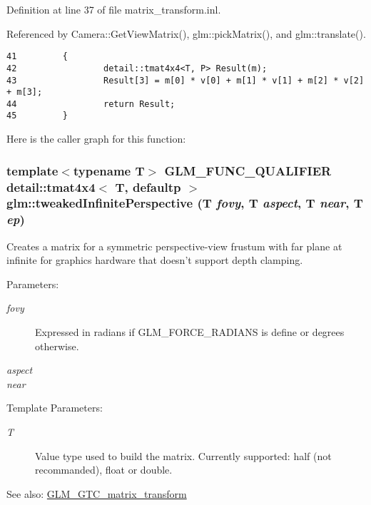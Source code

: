 Definition at line 37 of file matrix\_\-transform.inl.

Referenced by Camera::GetViewMatrix(), glm::pickMatrix(), and glm::translate().

\begin{Code}\begin{verbatim}41         {
42                 detail::tmat4x4<T, P> Result(m);
43                 Result[3] = m[0] * v[0] + m[1] * v[1] + m[2] * v[2] + m[3];
44                 return Result;
45         }
\end{verbatim}
\end{Code}




Here is the caller graph for this function:\hypertarget{group__gtc__matrix__transform_gb4748de5e549cbd83682c9d28a9ccdac}{
\subsubsection[tweakedInfinitePerspective]{\setlength{\rightskip}{0pt plus 5cm}template$<$typename T$>$ GLM\_\-FUNC\_\-QUALIFIER detail::tmat4x4$<$ T, defaultp $>$ glm::tweakedInfinitePerspective (T {\em fovy}, \/  T {\em aspect}, \/  T {\em near}, \/  T {\em ep})}}
\label{group__gtc__matrix__transform_gb4748de5e549cbd83682c9d28a9ccdac}


Creates a matrix for a symmetric perspective-view frustum with far plane at infinite for graphics hardware that doesn't support depth clamping.

\begin{Desc}
\item[Parameters:]
\begin{description}
\item[{\em fovy}]Expressed in radians if GLM\_\-FORCE\_\-RADIANS is define or degrees otherwise. \item[{\em aspect}]\item[{\em near}]\end{description}
\end{Desc}
\begin{Desc}
\item[Template Parameters:]
\begin{description}
\item[{\em T}]Value type used to build the matrix. Currently supported: half (not recommanded), float or double. \end{description}
\end{Desc}
\begin{Desc}
\item[See also:]\hyperlink{group__gtc__matrix__transform}{GLM\_\-GTC\_\-matrix\_\-transform} \end{Desc}


